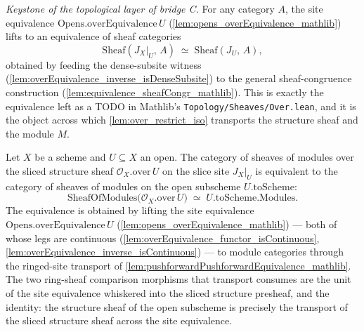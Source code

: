 \begin{definition}\leanok
  \label{def:overEquivalence_sheafCongr}
  \textit{Keystone of the topological layer of bridge C.}
  For any category \(A\), the site equivalence \(\mathrm{Opens.overEquivalence}\,U\)
  (\cref{lem:opens_overEquivalence_mathlib}) lifts to an equivalence of sheaf categories
  \[
    \mathrm{Sheaf}(J_X|_U,\, A) \;\simeq\; \mathrm{Sheaf}(J_U,\, A),
  \]
  obtained by feeding the dense-subsite witness
  (\cref{lem:overEquivalence_inverse_isDenseSubsite}) to the general sheaf-congruence
  construction (\cref{lem:equivalence_sheafCongr_mathlib}). This is exactly the equivalence left
  as a TODO in Mathlib's \texttt{Topology/Sheaves/Over.lean}, and it is the object across which
  \cref{lem:over_restrict_iso} transports the structure sheaf and the module \(M\).
\end{definition}



\begin{definition}
  \label{def:over_restrict_equiv}
  \leanok
  Let \(X\) be a scheme and \(U \subseteq X\) an open. The category of sheaves of modules
  over the sliced structure sheaf \(\mathcal{O}_X.\mathrm{over}\,U\) on the slice site
  \(J_X|_U\) is equivalent to the category of sheaves of modules on the open subscheme
  \(U.\mathrm{toScheme}\):
  \[
    \mathrm{SheafOfModules}\bigl(\mathcal{O}_X.\mathrm{over}\,U\bigr)
    \;\simeq\; U.\mathrm{toScheme}.\mathrm{Modules}.
  \]
  The equivalence is obtained by lifting the site equivalence
  \(\mathrm{Opens.overEquivalence}\,U\) (\cref{lem:opens_overEquivalence_mathlib}) — both of
  whose legs are continuous (\cref{lem:overEquivalence_functor_isContinuous},
  \cref{lem:overEquivalence_inverse_isContinuous}) — to module categories through the
  ringed-site transport of \cref{lem:pushforwardPushforwardEquivalence_mathlib}. The two
  ring-sheaf comparison morphisms that transport consumes are the unit of the site
  equivalence whiskered into the sliced structure presheaf, and the identity: the structure
  sheaf of the open subscheme is precisely the transport of the sliced structure sheaf
  across the site equivalence.
\end{definition}

